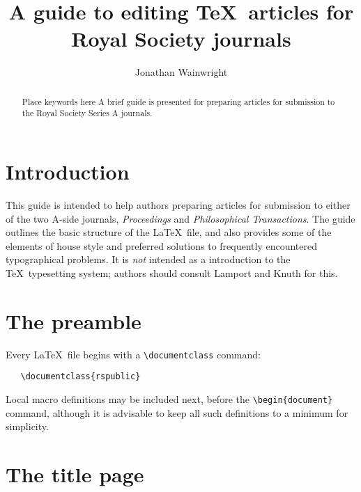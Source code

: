 \documentclass{rspublic}
\begin{document}
\title[A guide to editing \TeX\ articles]{A guide to
editing \TeX\ articles for\\ Royal Society journals}

\author[J. Wainwright]{Jonathan Wainwright}


\label{firstpage}

\maketitle

\begin{abstract}{Place keywords here}
A brief guide is presented for preparing articles for submission to the Royal Society
Series A journals.
\end{abstract}

\section{Introduction}

This guide is intended to help authors preparing articles for submission to either of
the two A-side journals, \textit{Proceedings} and \textit{Philosophical Transactions}.
The guide outlines the basic structure of the \LaTeX\ file, and also provides some of
the elements of house style and preferred solutions to frequently encountered
typographical problems. It is \textit{not} intended as a introduction to the \TeX\
typesetting system; authors should consult Lamport and Knuth for this.

\section{The preamble}

Every \LaTeX\ file begins with a \verb'\documentclass' command:
\begin{verbatim}
   \documentclass{rspublic}
\end{verbatim}

Local macro definitions may be included next, before the \verb'\begin{document}'
command, although it is advisable to keep all such definitions to a minimum for
simplicity.

\section{The title page}
\end{document}
